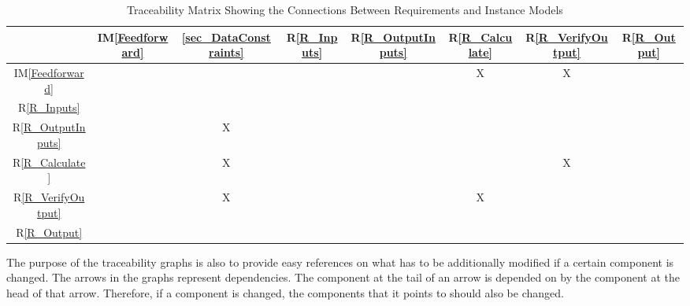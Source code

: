 \documentclass[12pt]{article}
\newcommand{\iref}[1]{IM\ref{#1}}
\newcommand{\rref}[1]{R\ref{#1}}
\begin{document}
\begin{table}[h!]
\centering
\begin{tabular}{|c|c|c|c|c|c|c|c|}
\hline
	& \iref{Feedforward}& \ref{sec_DataConstraints}& \rref{R_Inputs}& \rref{R_OutputInputs}& \rref{R_Calculate}& 
  \rref{R_VerifyOutput}& \rref{R_Output}\\
\hline
\iref{Feedforward}            & & & & & X& X& \\ \hline
\rref{R_Inputs}     & & & & & & & \\ \hline
\rref{R_OutputInputs}    & & X& & & & & \\ \hline
\rref{R_Calculate}   & & X& & & & X& \\ \hline
\rref{R_VerifyOutput}  & & X& & & X& & \\ \hline
\rref{R_Output}     & & & & & & & \\
\hline
\end{tabular}
\caption{Traceability Matrix Showing the Connections Between Requirements and Instance Models}
\label{Table:R_trace}
\end{table}

The purpose of the traceability graphs is also to provide easy references on
what has to be additionally modified if a certain component is changed.  The
arrows in the graphs represent dependencies. The component at the tail of an
arrow is depended on by the component at the head of that arrow. Therefore, if a
component is changed, the components that it points to should also be
changed. 



\end{document}
